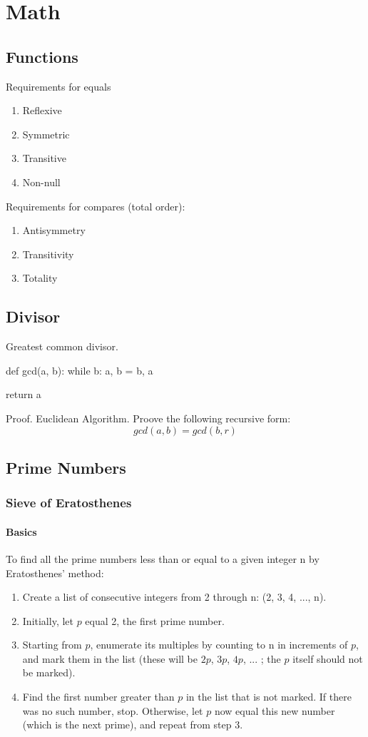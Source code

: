 \chapter{Math}

\section{Functions}
 Requirements for equals
\begin{enumerate}
\item Reflexive
\item Symmetric
\item Transitive
\item Non-null
\end{enumerate}
 Requirements for compares (total order):
\begin{enumerate}
\item Antisymmetry
\item Transitivity
\item Totality
\end{enumerate}
\section{Divisor}
 Greatest common divisor.

\begin{python}
def gcd(a, b):
    while b:
        a, b = b, a%

    return a
\end{python}

Proof. Euclidean Algorithm. Proove the following recursive form:
$$
gcd(a,b) = gcd(b, r)
$$
\section{Prime Numbers}
\subsection{Sieve of Eratosthenes}
\subsubsection{Basics}
To find all the prime numbers less than or equal to a given integer n by Eratosthenes' method:
\begin{enumerate}
\item Create a   list of consecutive integers from 2 through n: (2, 3, 4, ..., n).
\item Initially, let $p$ equal 2, the first prime number.
\item Starting from $p$, enumerate its multiples by counting to n in increments of  $p$, and mark them in the list (these will be $2p$, $3p$, $4p$, ... ; the $p$ itself should not be marked).
\item Find the first number greater than $p$ in the list that is not marked. If there was no such number, stop. Otherwise, let $p$ now equal this new number (which is the next prime), and repeat from step 3.
\end{enumerate}

